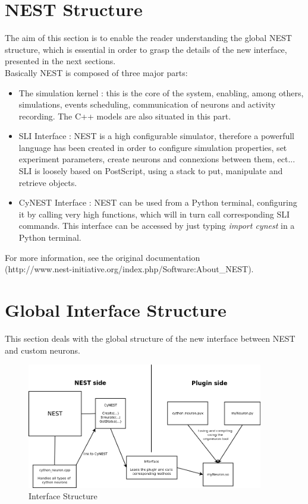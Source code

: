 \documentclass{article}
\begin{document}
\section{NEST Structure}
The aim of this section is to enable the reader understanding the global NEST structure, which is essential in order to grasp the details of the new interface, presented in the next sections.\\
Basically NEST is composed of three major parts:
\begin{itemize}
\item The simulation kernel : this is the core of the system, enabling, among others, simulations, events scheduling, communication of neurons and activity recording. The C++ models are also situated in this part.
\item SLI Interface : NEST is a high configurable simulator, therefore a powerfull language has been created in order to configure simulation properties, set experiment parameters, create neurons and connexions between them, ect... SLI is loosely based on PostScript, using a stack to put, manipulate and retrieve objects.
\item CyNEST Interface : NEST can be used from a Python terminal, configuring it by calling very high functions, which will in turn call corresponding SLI commands. This interface can be accessed by just typing \emph{import cynest} in a Python terminal.
\end{itemize}
For more information, see the original documentation\\ (http://www.nest-initiative.org/index.php/Software:About\_NEST).

\section{Global Interface Structure}
This section deals with the global structure of the new interface between NEST and custom neurons. 

\begin{figure}[h]
\begin{center}
\includegraphics[width=0.92\textwidth]{Ressources/Interface_Structure}
\caption{Interface Structure}
\end{center}
\end{figure}
\end{document}
